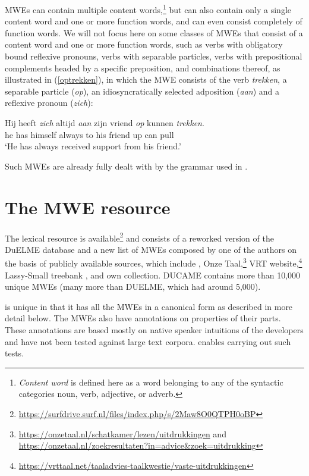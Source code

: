 \documentclass[output=paper,colorlinks,citecolor=brown]{langscibook}
\begin{document}
MWEs can contain multiple content words,\footnote{\textit{Content word} is defined here as a word belonging to any of the syntactic categories noun, verb, adjective, or adverb.} but can also contain only a single content word and one or more function words, and can even consist completely of function words. We will not focus here on some classes of MWEs that  consist of a content word and one or more function words,  such as verbs with obligatory bound reflexive pronouns, verbs with separable particles, verbs with prepositional complements headed by a specific preposition, and combinations thereof, as illustrated in (\ref{optrekken}), in which the MWE consists of the verb \textit{trekken}, a separable particle (\textit{op}), an idiosyncratically selected adposition (\textit{aan}) and a reflexive pronoun (\textit{zich}):

\begin{exe}
\ex\label{optrekken} \gll Hij heeft \textit{zich} altijd \textit{aan} zijn vriend \textit{op} kunnen \textit{trekken}.\\
         he has himself always to his friend up can pull\\ 
   \glt `He has always received support from his friend.’
\end{exe}

Such MWEs are already fully dealt with by the grammar used in {\mwefinder}.


\section{The {\DUCAME} MWE resource}
\label{mweresource}

The {\DUCAME} lexical resource is available\footnote{\url{https://surfdrive.surf.nl/files/index.php/s/2Maw8O0QTPH0oBP}} and consists of a reworked version of the DuELME database \citep{Gregoire:PhD:2009,duelme,Odijk:2013-382998} and a new list of MWEs  composed by one of the authors on the basis of publicly available sources, which include \citet{stoett1925nederlandsche}, Onze Taal,\footnote{\url{https://onzetaal.nl/schatkamer/lezen/uitdrukkingen} and \url{https://onzetaal.nl/zoekresultaten?in=advice&zoek=uitdrukking}} VRT website,\footnote{\url{https://vrttaal.net/taaladvies-taalkwestie/vaste-uitdrukkingen}} Lassy-Small treebank \citep{LASSY:2013}, and own collection. DUCAME contains more than 10,000 unique MWEs (many more than DUELME, which had around 5,000).

{\DUCAME} is unique in that it has all the MWEs in a canonical form as described in more detail below. The MWEs also have annotations on properties of their parts. These annotations are based mostly on native speaker intuitions of the developers and have not been tested against large text corpora. {\mwefinder} enables carrying out such tests. 
\end{document}
